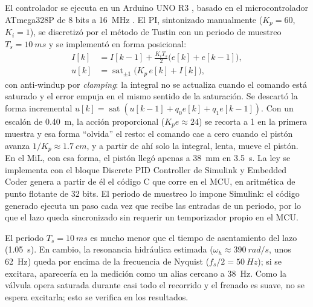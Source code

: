 \documentclass[conference]{IEEEtran}
\begin{document}
El controlador se ejecuta en un Arduino UNO R3 \cite{arduino_uno}, basado en el microcontrolador ATmega328P de 8 bits a \SI{16}{MHz} \cite{atmega328p}. El PI, sintonizado manualmente ($K_p=60$, $K_i=1$), se discretizó por el método de Tustin con un periodo de muestreo $T_s=\SI{10}{ms}$ y se implementó en forma posicional:
\begin{equation}
\begin{aligned}
I[k] &= I[k-1] + \tfrac{K_iT_s}{2}\big(e[k]+e[k-1]\big),\\
u[k] &= \operatorname{sat}_{\pm1}\!\big(K_p\, e[k] + I[k]\big),
\end{aligned}
\label{eq:pi}
\end{equation}
con anti-windup por \textit{clamping}: la integral no se actualiza cuando el comando está saturado y el error empuja en el mismo sentido de la saturación. Se descartó la forma incremental $u[k]=\operatorname{sat}(u[k-1]+q_0e[k]+q_1e[k-1])$. Con un escalón de \SI{0.40}{m}, la acción proporcional ($K_p e\approx24$) se recorta a 1 en la primera muestra y esa forma ``olvida'' el resto: el comando cae a cero cuando el pistón avanza $1/K_p\approx\SI{1.7}{cm}$, y a partir de ahí solo la integral, lenta, mueve el pistón. En el MiL, con esa forma, el pistón llegó apenas a \SI{38}{mm} en \SI{3.5}{s}. La ley se implementa con el bloque Discrete PID Controller de Simulink y Embedded Coder genera a partir de él el código C que corre en el MCU, en aritmética de punto flotante de 32 bits. El periodo de muestreo lo impone Simulink: el código generado ejecuta un paso cada vez que recibe las entradas de un periodo, por lo que el lazo queda sincronizado sin requerir un temporizador propio en el MCU.

El periodo $T_s=\SI{10}{ms}$ es mucho menor que el tiempo de asentamiento del lazo (\SI{1.05}{s}). En cambio, la resonancia hidráulica estimada ($\omega_h\approx\SI{390}{rad/s}$, unos \SI{62}{Hz}) queda por encima de la frecuencia de Nyquist ($f_s/2=\SI{50}{Hz}$); si se excitara, aparecería en la medición como un alias cercano a \SI{38}{Hz}. Como la válvula opera saturada durante casi todo el recorrido y el frenado es suave, no se espera excitarla; esto se verifica en los resultados.




\newpage
\end{document}
